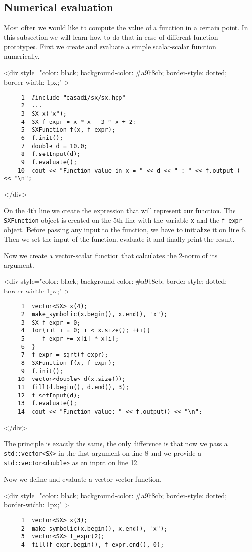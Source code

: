 \documentclass[a4paper,12pt]{book}
\newcommand{\codebegin}{
\begin{rawhtml}
<div style="color: black; background-color: \#a9b8cb;  border-style: dotted; border-width: 1px;" >
\end{rawhtml}
}
\newcommand{\codeend}{
\begin{rawhtml}
</div>
\end{rawhtml}
}
\newcommand{\codebegin}{

}
\newcommand{\codeend}{

}
\begin{document}
{\subsection*{Numerical evaluation}
Most often we would like to compute the value of a function in a certain point. In this subsection we will learn how to do that
 in case of different function prototypes.
First we create and evaluate a simple scalar-scalar function numerically.
\par
\codebegin
\begin{verbatim}
     1  #include "casadi/sx/sx.hpp"
     2  ...
     3  SX x("x");
     4  SX f_expr = x * x - 3 * x + 2;
     5  SXFunction f(x, f_expr);
     6  f.init();
     7  double d = 10.0;
     8  f.setInput(d);
     9  f.evaluate();
    10  cout << "Function value in x = " << d << " : " << f.output() << "\n";
\end{verbatim}
\codeend
On the 4th line we create the expression that will represent our function. The \texttt{SXFunction}
object is created on the 5th line with the variable \texttt{x} and the \texttt{f\_expr} object.
Before passing any input to the function, we have to initialize it on line 6. Then we set the input
of the function, evaluate it and finally print the result.
\par\noindent
Now we create a vector-scalar function that calculates the 2-norm of its argument.
\par
\codebegin
\begin{verbatim}
     1  vector<SX> x(4);
     2  make_symbolic(x.begin(), x.end(), "x");
     3  SX f_expr = 0;
     4  for(int i = 0; i < x.size(); ++i){
     5     f_expr += x[i] * x[i];
     6  }
     7  f_expr = sqrt(f_expr);
     8  SXFunction f(x, f_expr);
     9  f.init();
    10  vector<double> d(x.size());
    11  fill(d.begin(), d.end(), 3);
    12  f.setInput(d);
    13  f.evaluate();
    14  cout << "Function value: " << f.output() << "\n";
\end{verbatim}
\codeend
The principle is exactly the same, the only difference is that now we pass a \texttt{std::vector<SX>} in the first argument
on line 8 and we provide a \texttt{std::vector<double>} as an input on line 12.
\par\noindent
Now we define and evaluate a vector-vector function.
\par 
\codebegin
\begin{verbatim}
     1  vector<SX> x(3);
     2  make_symbolic(x.begin(), x.end(), "x");
     3  vector<SX> f_expr(2);
     4  fill(f_expr.begin(), f_expr.end(), 0);

\end{verbatim}}
\end{document}
